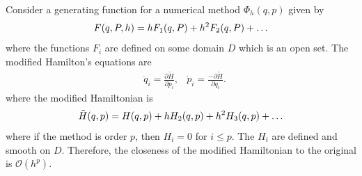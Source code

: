 \begin{theorem}{\cite{gni2006, Casas_2016}}
Consider a generating function for a numerical method $\Phi_h(q,p)$ given by
\begin{equation}
	F(q,P,h) = h F_1(q,P) + h^2 F_2(q,P) + \mathellipsis
	\label{eqn:methodgen}
\end{equation}
where the functions $F_i$ are defined on some domain $D$ which is an open set.
The modified Hamilton's equations are 
\begin{align*}
	&\dot{q}_i = \frac{\partial \tilde{H}}{\partial p_i}, &\dot{p}_i = \frac{- \partial \tilde{H}}{\partial q_i}.
\end{align*}
where the modified Hamiltonian is
\begin{equation}
	\tilde{H}(q,p) = H(q,p) + h H_2(q,p) + h^2 H_3(q,p) + \mathellipsis
	\label{eqn:powerham}	
\end{equation}
where if the method is order $p$, then $H_i = 0$ for $i \leq p$.
The $H_i$ are defined and smooth on $D$.
Therefore, the closeness of the modified Hamiltonian to the original is $\mathcal{O}(h^p)$.
\end{theorem}

